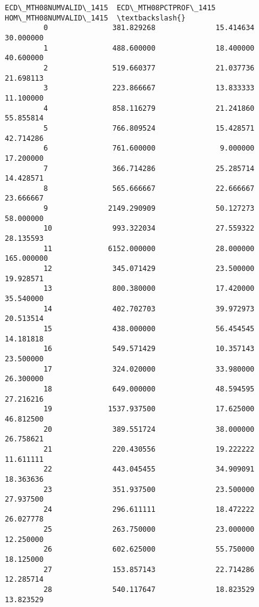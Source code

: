 \documentclass[11pt]{article}
\begin{document}
\begin{Verbatim}[commandchars=\\\{\}]
             ECD\_MTH08NUMVALID\_1415  ECD\_MTH08PCTPROF\_1415  HOM\_MTH08NUMVALID\_1415  \textbackslash{}
         0               381.829268              15.414634               30.000000   
         1               488.600000              18.400000               40.600000   
         2               519.660377              21.037736               21.698113   
         3               223.866667              13.833333               11.100000   
         4               858.116279              21.241860               55.855814   
         5               766.809524              15.428571               42.714286   
         6               761.600000               9.000000               17.200000   
         7               366.714286              25.285714               14.428571   
         8               565.666667              22.666667               23.666667   
         9              2149.290909              50.127273               58.000000   
         10              993.322034              27.559322               28.135593   
         11             6152.000000              28.000000              165.000000   
         12              345.071429              23.500000               19.928571   
         13              800.380000              17.420000               35.540000   
         14              402.702703              39.972973               20.513514   
         15              438.000000              56.454545               14.181818   
         16              549.571429              10.357143               23.500000   
         17              324.020000              33.980000               26.300000   
         18              649.000000              48.594595               27.216216   
         19             1537.937500              17.625000               46.812500   
         20              389.551724              38.000000               26.758621   
         21              220.430556              19.222222               11.611111   
         22              443.045455              34.909091               18.363636   
         23              351.937500              23.500000               27.937500   
         24              296.611111              18.472222               26.027778   
         25              263.750000              23.000000               12.250000   
         26              602.625000              55.750000               18.125000   
         27              153.857143              22.714286               12.285714   
         28              540.117647              18.823529               13.823529   

\end{Verbatim}
\end{document}
